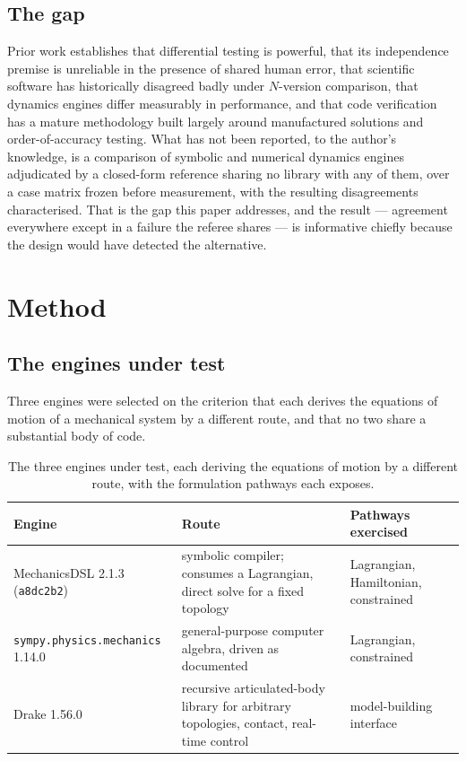 \documentclass[review,12pt]{elsarticle}
\begin{document}
\subsection{The gap}
Prior work establishes that differential testing is powerful, that its
independence premise is unreliable in the presence of shared human error, that
scientific software has historically disagreed badly under $N$-version
comparison, that dynamics engines differ measurably in performance, and that
code verification has a mature methodology built largely around manufactured
solutions and order-of-accuracy testing. What has
not been reported, to the author's knowledge, is a comparison of symbolic and
numerical dynamics engines adjudicated by a closed-form reference sharing no
library with any of them, over a case matrix frozen before measurement, with the
resulting disagreements characterised. That is the gap this paper addresses, and
the result --- agreement everywhere except in a failure the referee shares --- is
informative chiefly because the design would have detected the alternative.

\section{Method}

\subsection{The engines under test}
Three engines were selected on the criterion that each derives the equations of
motion of a mechanical system by a different route, and that no two share a
substantial body of code.

\begin{table}[!htbp]
\centering
\caption{The three engines under test, each deriving the equations of motion by
a different route, with the formulation pathways each exposes.}
\label{tab:engines}
\footnotesize
\setlength{\tabcolsep}{4pt}
\begin{tabular}{@{}L{0.26\textwidth}L{0.32\textwidth}L{0.26\textwidth}@{}}
\toprule
\textbf{Engine} & \textbf{Route} & \textbf{Pathways exercised} \\
\midrule
MechanicsDSL 2.1.3
(\texttt{a8dc2b2}) & symbolic compiler; consumes a Lagrangian, direct solve for a fixed topology & Lagrangian, Hamiltonian, constrained \\
\texttt{sympy.\allowbreak physics.\allowbreak mechanics} 1.14.0 & general-purpose computer algebra, driven as documented & Lagrangian, constrained \\
Drake 1.56.0 & recursive articulated-body library for arbitrary topologies, contact, real-time control & model-building interface \\
\bottomrule
\end{tabular}
\end{table}
\end{document}
